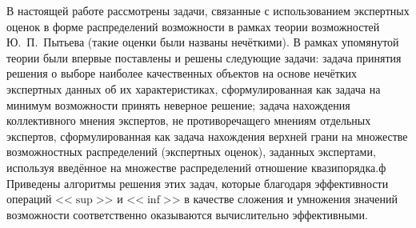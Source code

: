 
В настоящей работе рассмотрены задачи, связанные с  использованием экспертных оценок в форме распределений возможности в рамках теории возможностей Ю.~П.~Пытьева (такие оценки были названы нечёткими). В рамках упомянутой теории были впервые поставлены и решены следующие задачи:
задача принятия решения о выборе наиболее качественных объектов на основе нечётких экспертных данных об их характеристиках, сформулированная как задача на минимум возможности принять неверное решение;
задача нахождения коллективного мнения экспертов, не противоречащего мнениям отдельных экспертов, сформулированная как задача нахождения верхней грани на множестве возможностных распределений (экспертных оценок), заданных экспертами, используя введённое на множестве распределений отношение квазипорядка.ф 
 Приведены алгоритмы решения этих задач, которые благодаря эффективности операций <<$\sup$>> и <<$\inf$>> в качестве сложения и умножения значений возможности соответственно оказываются вычислительно эффективными.